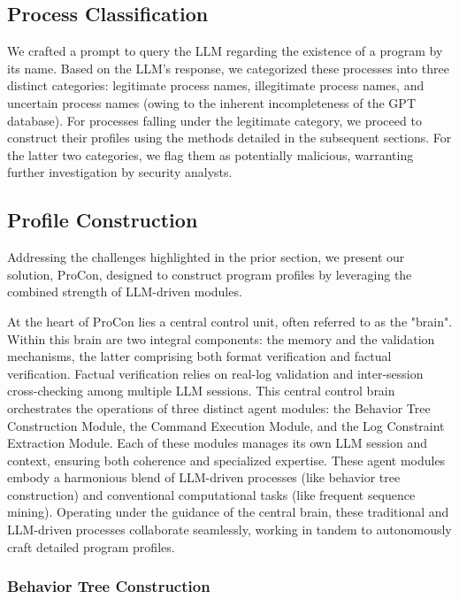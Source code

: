 \subsection{Process Classification}
We crafted a prompt to query the LLM regarding the existence of a program by its name. Based on the LLM's response, we categorized these processes into three distinct categories: legitimate process names, illegitimate process names, and uncertain process names (owing to the inherent incompleteness of the GPT database). For processes falling under the legitimate category, we proceed to construct their profiles using the methods detailed in the subsequent sections. For the latter two categories, we flag them as potentially malicious, warranting further investigation by security analysts.

\subsection{Profile Construction}

Addressing the challenges highlighted in the prior section, we present our solution, ProCon, designed to construct program profiles by leveraging the combined strength of LLM-driven modules.

At the heart of ProCon lies a central control unit, often referred to as the "brain". Within this brain are two integral components: the memory and the validation mechanisms, the latter comprising both format verification and factual verification. Factual verification relies on real-log validation and inter-session cross-checking among multiple LLM sessions.
This central control brain orchestrates the operations of three distinct agent modules: the Behavior Tree Construction Module, the Command Execution Module, and the Log Constraint Extraction Module. Each of these modules manages its own LLM session and context, ensuring both coherence and specialized expertise.
These agent modules embody a harmonious blend of LLM-driven processes (like behavior tree construction) and conventional computational tasks (like frequent sequence mining). Operating under the guidance of the central brain, these traditional and LLM-driven processes collaborate seamlessly, working in tandem to autonomously craft detailed program profiles.




\subsubsection{Behavior Tree Construction}

